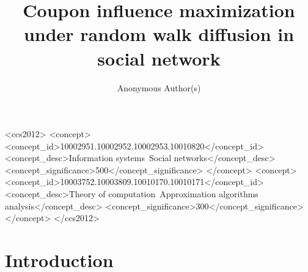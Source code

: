 \documentclass[sigconf]{acmart}
\begin{document}
\title{Coupon influence maximization under random walk diffusion in social network}

\author{Anonymous Author(s)}

\renewcommand{\shortauthors}{Anon.}

\begin{abstract}

  

\end{abstract}

\begin{CCSXML}
<ccs2012>
 <concept>
  <concept_id>10002951.10002952.10002953.10010820</concept_id>
  <concept_desc>Information systems~Social networks</concept_desc>
  <concept_significance>500</concept_significance>
 </concept>
 <concept>
  <concept_id>10003752.10003809.10010170.10010171</concept_id>
  <concept_desc>Theory of computation~Approximation algorithms analysis</concept_desc>
  <concept_significance>300</concept_significance>
 </concept>
</ccs2012>
\end{CCSXML}



\maketitle

\section{Introduction}
\label{sec:intro}
\end{document}
